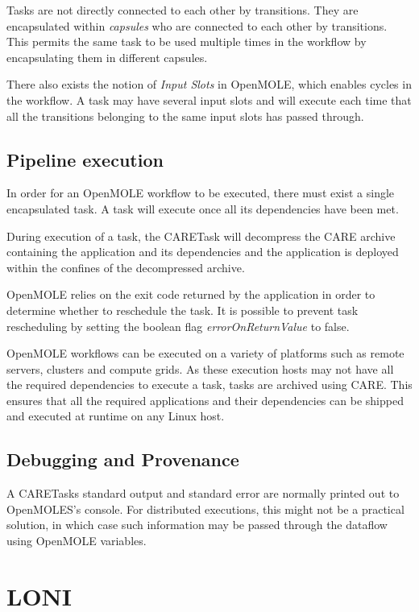 \documentclass{report}
\begin{document}
      Tasks are not directly connected to each other by transitions. They are
encapsulated within \textit{capsules} who are connected to each other by
transitions. This permits the same task to be used multiple times in the
workflow by encapsulating them in different capsules.

    There also exists the notion of \textit{Input Slots} in OpenMOLE, which enables
cycles in the workflow. A task may have several input slots and will execute
each time that all the transitions belonging to the same input slots has passed
through.
 
                

        \subsection{Pipeline execution}

      In order for an OpenMOLE workflow to be executed, there must exist a
single encapsulated task. A task will execute once all its dependencies have
been met. 

    During execution of a task, the CARETask will decompress the CARE archive
containing the application and its dependencies and the application is deployed
within the confines of the decompressed archive. 

OpenMOLE relies on the exit code returned by the application in order to
determine whether to reschedule the task. It is possible to prevent task
rescheduling by setting the boolean flag \textit{errorOnReturnValue} to false.
    
      OpenMOLE workflows can be executed on a variety of platforms such as
remote servers, clusters and compute grids. As these execution hosts may not have all
the required dependencies to execute a task, tasks are archived using CARE. This
ensures that all the required applications and their dependencies can be shipped
and executed at runtime on any Linux host.


        \subsection{Debugging and Provenance}
    A CARETasks standard output and standard error are normally printed out to
OpenMOLES's console. For distributed executions, this might not be a practical
solution, in which case such information may be passed through
the dataflow using OpenMOLE variables.

    \section{LONI}
\end{document}
